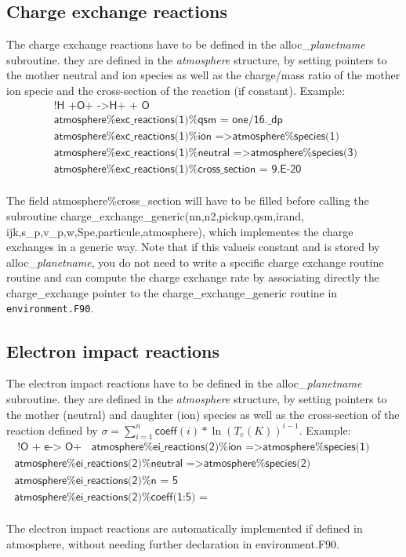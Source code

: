 \documentclass{article}
\begin{document}
\subsection{Charge exchange reactions}
The charge exchange reactions have to be defined in the {\sf alloc\_}{\it planetname} subroutine. they are defined in the {\it atmosphere} structure, by setting pointers to the mother neutral and ion species as well as the charge/mass ratio of the mother ion specie and the cross-section of the reaction (if constant). Example:
\[
\begin{array}{l}
  \textsf{  !H +O+ -$>$H+ + O}\\
  \textsf{  atmosphere\%exc\_reactions(1)\%qsm        = one/16.\_dp}\\
  \textsf{  atmosphere\%exc\_reactions(1)\%ion        =$>$atmosphere\%species(1)}\\
  \textsf{  atmosphere\%exc\_reactions(1)\%neutral    =$>$atmosphere\%species(3)}\\
  \textsf{  atmosphere\%exc\_reactions(1)\%cross\_section = 9.E-20}
\end{array}
\]\\
The field atmosphere\%cross\_section will have to be filled before calling the subroutine {\sf charge\_exchange\_generic(nn,n2,pickup,qsm,irand, ijk,s\_p,v\_p,w,Spe,particule,atmosphere)}, which implementes the charge exchanges in a generic way. Note that if this valueis constant and is stored by {\sf alloc\_}{\it planetname}, you do not need to write a specific charge exchange routine routine and can compute the charge exchange rate by associating directly the charge\_exchange pointer to the {\sf charge\_exchange\_generic} routine in {\tt environment.F90}.\\


\subsection{Electron impact reactions}
The electron impact reactions have to be defined in the {\sf alloc\_}{\it planetname} subroutine. they are defined in the {\it atmosphere} structure, by setting pointers to the mother (neutral) and daughter (ion) species as well as the cross-section of the reaction defined by $\sigma=\sum_{i=1}^n \textsf{coeff}(i)*\ln(T_e(K))^{i-1}$. Example:
\[
\begin{array}{l}
  \textsf{  !O + e-$>$ O+}
  \textsf{  atmosphere\%ei\_reactions(2)\%ion        =$>$atmosphere\%species(1)}\\
  \textsf{  atmosphere\%ei\_reactions(2)\%neutral    =$>$atmosphere\%species(2)}\\
  \textsf{  atmosphere\%ei\_reactions(2)\%n          = 5}\\
  \textsf{  atmosphere\%ei\_reactions(2)\%coeff(1:5) = (/-1233.29,347.764,-37.4128,1.79337,-0.032277/)}
\end{array}
\]\\
The electron impact reactions are automatically implemented if defined in {\sf atmosphere}, without needing further declaration in {\sf environment.F90}.\\
\end{document}

